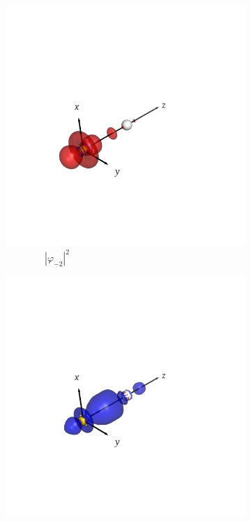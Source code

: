 \documentclass[journal=inoraj,manuscript=article]{achemso}
\begin{document}
\begin{figure}[!h]
    \vspace{0.0cm}
    \begin{subfigure}[t]{0.32\textwidth}
        \centering
        \includegraphics[width=\linewidth]{./AuOg+/nocv-3.png}
        \caption*{\ \ \ \ \ \ \ \ $|\varphi_{-2}|^2$}
    \end{subfigure}
    \hfill
    \begin{subfigure}[t]{0.32\textwidth}
        \centering
        \includegraphics[width=\linewidth]{./AuOg+/nocv+3.png}

\end{subfigure}
\end{figure}
\end{document}
